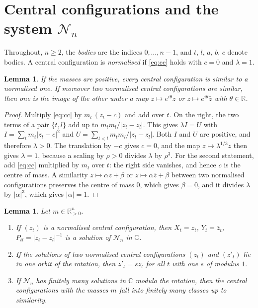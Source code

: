 \documentclass[11pt]{amsart}
\newtheorem{lemma}[theorem]{Lemma}
\theoremstyle{definition}
\theoremstyle{remark}
\numberwithin{equation}{section}
\newcommand{\CC}{\mathbb{C}}
\newcommand{\RR}{\mathbb{R}}
\newcommand{\cN}{\mathcal{N}}
\begin{document}
\section{Central configurations and the system \texorpdfstring{$\cN_n$}{N\_n}}\label{sec:system}

Throughout, $n \ge 2$, the \emph{bodies} are the indices $0, \dots, n-1$, and $t$, $l$, $a$, $b$, $c$
denote bodies. A central configuration is \emph{normalised} if \eqref{eq:cc} holds with $c = 0$ and
$\lambda = 1$.

\begin{lemma}\label{lem:norm}
If the masses are positive, every central configuration is similar to a normalised one. If moreover two
normalised central configurations are similar, then one is the image of the other under a map
$z \mapsto e^{i\theta} z$ or $z \mapsto e^{i\theta} \bar z$ with $\theta \in \RR$.
\end{lemma}

\begin{proof}
Multiply \eqref{eq:cc} by $m_t\, \overline{(z_t - c)}$ and add over $t$. On the right, the two terms of a
pair $\{t, l\}$ add up to $m_t m_l / |z_t - z_l|$. This gives $\lambda I = U$ with
$I = \sum_t m_t |z_t - c|^2$ and $U = \sum_{t < l} m_t m_l / |z_t - z_l|$. Both $I$ and $U$ are positive,
and therefore $\lambda > 0$. The translation by $-c$ gives $c = 0$, and the map
$z \mapsto \lambda^{1/3} z$ then gives $\lambda = 1$, because a scaling by $\rho > 0$ divides $\lambda$
by $\rho^{3}$. For the second statement, add \eqref{eq:cc} multiplied by $m_t$ over $t$: the right side
vanishes, and hence $c$ is the centre of mass. A similarity $z \mapsto \alpha z + \beta$ or
$z \mapsto \alpha \bar z + \beta$ between two normalised configurations preserves the centre of mass
$0$, which gives $\beta = 0$, and it divides $\lambda$ by $|\alpha|^{3}$, which gives $|\alpha| = 1$.
\end{proof}

\begin{lemma}\label{lem:cc-sol}
Let $m \in \RR_{>0}^n$.
\begin{enumerate}
\item[(a)] If $(z_t)$ is a normalised central configuration, then $X_t = z_t$, $Y_t = \bar z_t$,
$P_{tl} = |z_t - z_l|^{-1}$ is a solution of $\cN_n$ in $\CC$.
\item[(b)] If the solutions of two normalised central configurations $(z_t)$ and $(z'_t)$ lie in one orbit
of the rotation, then $z'_t = s z_t$ for all $t$ with one $s$ of modulus $1$.
\item[(c)] If $\cN_n$ has finitely many solutions in $\CC$ modulo the rotation, then the central
configurations with the masses $m$ fall into finitely many classes up to similarity.
\end{enumerate}
\end{lemma}
\end{document}
